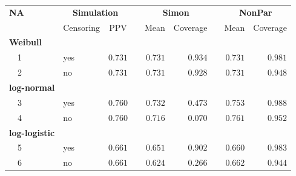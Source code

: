 \begin{table}[!tbp]
\begin{center}
\begin{tabular}{llrcrrcrr}
\hline\hline
\multicolumn{1}{l}{\bfseries NA}&\multicolumn{2}{c}{\bfseries Simulation}&\multicolumn{1}{c}{\bfseries }&\multicolumn{2}{c}{\bfseries Simon}&\multicolumn{1}{c}{\bfseries }&\multicolumn{2}{c}{\bfseries NonPar}\tabularnewline
\cline{2-3} \cline{5-6} \cline{8-9}
\multicolumn{1}{l}{}&\multicolumn{1}{c}{Censoring}&\multicolumn{1}{c}{PPV}&\multicolumn{1}{c}{}&\multicolumn{1}{c}{Mean}&\multicolumn{1}{c}{Coverage}&\multicolumn{1}{c}{}&\multicolumn{1}{c}{Mean}&\multicolumn{1}{c}{Coverage}\tabularnewline
\hline
{\bfseries Weibull}&&&&&&&&\tabularnewline
~~1&yes&$0.731$&&$0.731$&$0.934$&&$0.731$&$0.981$\tabularnewline
~~2&no&$0.731$&&$0.731$&$0.928$&&$0.731$&$0.948$\tabularnewline
\hline
{\bfseries log-normal}&&&&&&&&\tabularnewline
~~3&yes&$0.760$&&$0.732$&$0.473$&&$0.753$&$0.988$\tabularnewline
~~4&no&$0.760$&&$0.716$&$0.070$&&$0.761$&$0.952$\tabularnewline
\hline
{\bfseries log-logistic}&&&&&&&&\tabularnewline
~~5&yes&$0.661$&&$0.651$&$0.902$&&$0.660$&$0.983$\tabularnewline
~~6&no&$0.661$&&$0.624$&$0.266$&&$0.662$&$0.944$\tabularnewline
\hline
\end{tabular}\end{center}
\end{table}
